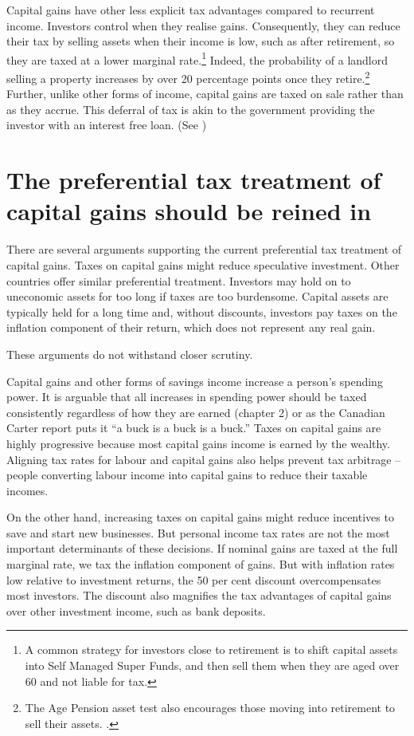 \documentclass{grattan}\usepackage[]{graphicx}\usepackage[]{color}
\begin{document}
Capital gains have other less explicit tax advantages compared to recurrent income. Investors control when they realise gains. Consequently, they can reduce their tax by selling assets when their income is low, such as after retirement, so they are taxed at a lower marginal rate.\footnote{A common strategy for investors close to retirement is to shift capital assets into Self Managed Super Funds, and then sell them when they are aged over 60 and not liable for tax.}  Indeed, the probability of a landlord selling a property increases by over 20 percentage points once they retire.\footnote{The Age Pension asset test also encourages those moving into retirement to sell their assets. \textcite{Wood2010a}.}
Further, unlike other forms of income, capital gains are taxed on sale rather than as they accrue. This deferral of tax is akin to the government providing the investor with an interest free loan. (See )

\section{The preferential tax treatment of capital gains should be reined in}\label{sec:ShouldCapitalGainsBeTaxedConsistently}
There are several arguments supporting the current preferential tax treatment of capital gains. Taxes on capital gains might reduce speculative investment. Other countries offer similar preferential treatment. Investors may hold on to uneconomic assets for too long if taxes are too burdensome. Capital assets are typically held for a long time and, without discounts, investors pay taxes on the inflation component of their return, which does not represent any real gain. 

These arguments do not withstand closer scrutiny.

Capital gains and other forms of savings income increase a person's spending power. It is arguable that all increases in spending power should be taxed consistently regardless of how they are earned (chapter 2) or as the Canadian Carter report puts it ``a buck is a buck is a buck.''  Taxes on capital gains are highly progressive because most capital gains income is earned by the wealthy. Aligning tax rates for labour and capital gains also helps prevent tax arbitrage -- people converting labour income into capital gains to reduce their taxable incomes. 

On the other hand, increasing taxes on capital gains might reduce incentives to save and start new businesses. But personal income tax rates are not the most important determinants of these decisions. If nominal gains are taxed at the full marginal rate, we tax the inflation component of gains.  But with inflation rates low relative to investment returns, the 50 per cent discount overcompensates most investors. The discount also magnifies the tax advantages of capital gains over other investment income, such as bank deposits.
\end{document}
